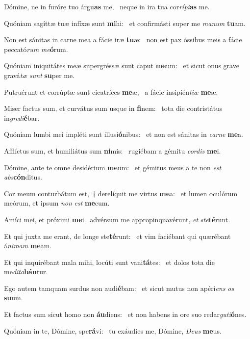 \item Dómine, ne in furóre tuo árgu\textbf{as} me,~\psstar{} neque in ira tua cor\textit{rípi}\textbf{as} me.
\item Quóniam sagíttæ tuæ infíxæ sunt \textbf{mi}hi:~\psstar{} et confirmásti super me \textit{manum} \textbf{tu}am.
\item Non est sánitas in carne mea a fácie iræ \textbf{tu}æ:~\psstar{} non est pax óssibus meis a fácie peccató\textit{rum} \textit{me}\textbf{ó}rum.
\item Quóniam iniquitátes meæ supergréssæ sunt caput \textbf{me}um:~\psstar{} et sicut onus grave gravá\textit{tæ} \textit{sunt} \textbf{su}per me.
\item Putruérunt et corrúptæ sunt cicatríces \textbf{me}æ,~\psstar{} a fácie insipién\textit{tiæ} \textbf{me}æ.
\item Miser factus sum, et curvátus sum usque in \textbf{fi}nem:~\psstar{} tota die contristátus in\textit{gredi}\textbf{é}bar.
\item Quóniam lumbi mei impléti sunt illusi\textbf{ó}nibus:~\psstar{} et non est sánitas in \textit{carne} \textbf{me}a.
\item Afflíctus sum, et humiliátus sum \textbf{ni}mis:~\psstar{} rugiébam a gémitu \textit{cordis} \textbf{me}i.
\item Dómine, ante te omne desidérium \textbf{me}um:~\psstar{} et gémitus meus a te non \textit{est} \textit{abs}\textbf{cón}ditus.
\item Cor meum conturbátum est,~† derelíquit me virtus \textbf{me}a:~\psstar{} et lumen oculórum meórum, et ipsum \textit{non} \textit{est} \textbf{me}cum.
\item Amíci mei, et próximi \textbf{me}i~\psstar{} advérsum me appropinquavérunt, \textit{et} \textit{ste}\textbf{té}runt.
\item Et qui juxta me erant, de longe ste\textbf{té}runt:~\psstar{} et vim faciébant qui quærébant á\textit{nimam} \textbf{me}am.
\item Et qui inquirébant mala mihi, locúti sunt vani\textbf{tá}tes:~\psstar{} et dolos tota die me\textit{dita}\textbf{bán}tur.
\item Ego autem tamquam surdus non audi\textbf{é}bam:~\psstar{} et sicut mutus non apéri\textit{ens} \textit{os} \textbf{su}um.
\item Et factus sum sicut homo non \textbf{áu}diens:~\psstar{} et non habens in ore suo redar\textit{guti}\textbf{ó}nes.
\item Quóniam in te, Dómine, spe\textbf{rá}vi:~\psstar{} tu exáudies me, Dómine, \textit{Deus} \textbf{me}us.
